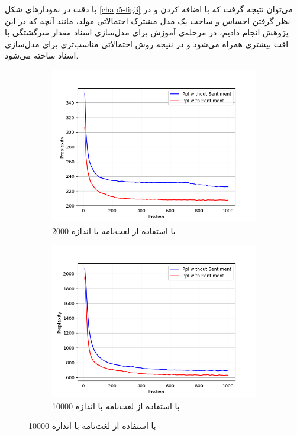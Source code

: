 با دقت در نمودار‌های شکل
\ref{chap5-fig3}
می‌توان نتیجه گرفت که با اضافه کردن و در نظر گرفتن احساس و ساخت یک مدل مشترک احتمالاتی مولد، مانند آنچه که در این پژوهش انجام دادیم، در مرحله‌ی آموزش برای مدل‌سازی اسناد مقدار سرگشتگی با افت بیشتری همراه می‌‌شود و در نتیجه روش احتمالاتی مناسب‌تری برای مدل‌سازی اسناد ساخته می‌‌شود.
	\begin{figure}[!t]
		\centering
		\begin{subfigure}{.45\textwidth}
			\includegraphics[scale = .4]{chap5-img/ppl_2000}
			\caption{ با استفاده از  لغت‌نامه با اندازه 2000}
			\label{chap5-fig3sub1}
		\end{subfigure}		
		\begin{subfigure}{.45\textwidth}
			\includegraphics[scale =.4]{chap5-img/ppl_10000}
			\caption{ با استفاده از  لغت‌نامه با اندازه 10000 }
			\label{chap5-fig3sub2}
		\end{subfigure}
		

\end{figure}
